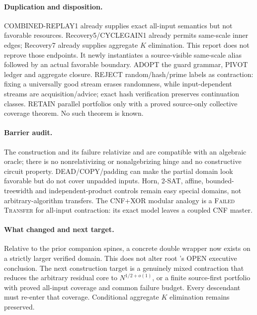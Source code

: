 \documentclass[11pt]{article}
\begin{document}
\paragraph{Duplication and disposition.}
COMBINED-REPLAY1 already supplies exact all-input semantics but not favorable
resources.  Recovery5/CYCLEGAIN1 already permits same-scale inner edges;
Recovery7 already supplies aggregate $K$ elimination.  This report does not
reprove those endpoints.  It newly instantiates a source-visible same-scale
alias followed by an actual favorable boundary.  ADOPT the guard grammar,
PIVOT ledger and aggregate closure.  REJECT random/hash/prime labels as
contraction: fixing a universally good stream erases randomness, while
input-dependent streams are acquisition/advice; exact hash verification
preserves continuation classes.  RETAIN parallel portfolios only with a
proved source-only collective coverage theorem.  No such theorem is known.

\paragraph{Barrier audit.}
The construction and its failure relativize and are compatible with an
algebraic oracle; there is no nonrelativizing or nonalgebrizing hinge and no
constructive circuit property.  DEAD/COPY/padding can make the partial domain
look favorable but do not cover unpadded inputs.  Horn, 2-SAT, affine,
bounded-treewidth and independent-product controls remain easy special
domains, not arbitrary-algorithm transfers.  The CNF+XOR modular analogy is a
\textsc{Failed Transfer} for all-input contraction: its exact model leaves a
coupled CNF master.

\paragraph{What changed and next target.}
Relative to the prior companion spines, a concrete double wrapper now exists
on a strictly larger verified domain.  This does not alter root
's OPEN executive conclusion.  The next construction target is
a genuinely mixed contraction that reduces the arbitrary residual core to
$N^{1/2+o(1)}$, or a finite source-first portfolio with proved all-input
coverage and common failure budget.  Every descendant must re-enter that
coverage.  Conditional aggregate $K$ elimination remains preserved.

\end{document}
